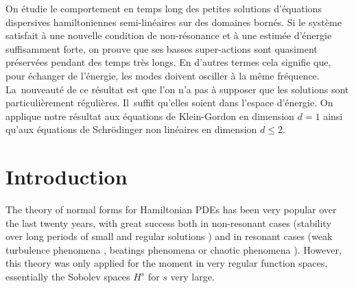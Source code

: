 \documentclass[JEP,XML,SOM,Unicode,NoEqCountersInSection,published]{cedram}
\theoremstyle{definition}
\begin{document}
\begin{altabstract}
On étudie le comportement en temps long des petites solutions d'équations dispersives hamil\-toniennes semi-linéaires sur des domaines bornés. Si le système satisfait à une nouvelle condition de non-résonance et à une estimée d'énergie suffisamment forte, on prouve que ses basses super-actions sont quasiment préservées pendant des temps très longs. En d'autres termes cela signifie que, pour échanger de l'énergie, les modes doivent osciller à la même fréquence. La~nouveauté de ce résultat est que l'on n'a pas à supposer que les solutions sont particulièrement régulières. Il~suffit qu'elles soient dans l'espace d'énergie. On applique notre résultat aux équations de Klein-Gordon en dimension $d=1$ ainsi qu'aux équations de Schrödinger non linéaires en dimension $d\leq2$.\end{altabstract}
\maketitle

\vspace*{-\baselineskip}
\tableofcontents
\mainmatter

\section{Introduction}

The theory of normal forms for Hamiltonian PDEs has been very popular over the last twenty years, with great success both in non-resonant cases (stability over long periods of small and regular solutions \cite{Bou96,Bam99,Bou00,Bam03,BG06,BDGS07,GIP,Del12,FGL13,YZ14,BD17,FI19,KillBill,BMP20,FI20,KtA}) and in resonant cases (weak turbulence phenomena \cite{CKSTT10,CF12,GG12,GK15}, beatings phenomena \cite{GV,GT12,HP17} or chaotic phenomena \cite{GGMP21}). However, this theory was only applied for the moment in very regular function spaces, essentially the Sobolev spaces $H^s$ for $s$ very large.\enlargethispage{\baselineskip}%
\end{document}
